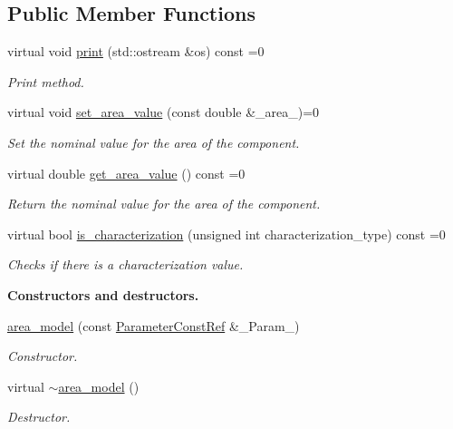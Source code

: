 \subsection*{Public Member Functions}
\begin{DoxyCompactItemize}
\item 
virtual void \hyperlink{classarea__model_abdb74eba19254bd8c2098c006aef673c}{print} (std\+::ostream \&os) const =0
\begin{DoxyCompactList}\small\item\em Print method. \end{DoxyCompactList}\item 
virtual void \hyperlink{classarea__model_a7c533a6a1b352493c04980d0734f89e5}{set\+\_\+area\+\_\+value} (const double \&\+\_\+area\+\_\+)=0
\begin{DoxyCompactList}\small\item\em Set the nominal value for the area of the component. \end{DoxyCompactList}\item 
virtual double \hyperlink{classarea__model_a390c12b38a4f2b1a137f6029d5494b97}{get\+\_\+area\+\_\+value} () const =0
\begin{DoxyCompactList}\small\item\em Return the nominal value for the area of the component. \end{DoxyCompactList}\item 
virtual bool \hyperlink{classarea__model_ae885ec3d0b487d31fd2e7537dd588ce3}{is\+\_\+characterization} (unsigned int characterization\+\_\+type) const =0
\begin{DoxyCompactList}\small\item\em Checks if there is a characterization value. \end{DoxyCompactList}\end{DoxyCompactItemize}
\begin{Indent}\textbf{ Constructors and destructors.}\par
\begin{DoxyCompactItemize}
\item 
\hyperlink{classarea__model_af0ba30d33b5574a55d8b5c6fe642821f}{area\+\_\+model} (const \hyperlink{Parameter_8hpp_a37841774a6fcb479b597fdf8955eb4ea}{Parameter\+Const\+Ref} \&\+\_\+\+Param\+\_\+)
\begin{DoxyCompactList}\small\item\em Constructor. \end{DoxyCompactList}\item 
virtual \hyperlink{classarea__model_acb398b80dddd92ad4622157a57dd8b2d}{$\sim$area\+\_\+model} ()
\begin{DoxyCompactList}\small\item\em Destructor. \end{DoxyCompactList}\end{DoxyCompactItemize}
\end{Indent}
